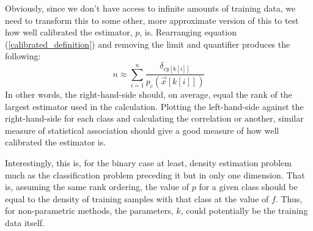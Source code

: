 \documentclass{article}
\newcommand{\binarydecision}{f}
\newcommand{\param}{k}
\newcommand{\estimator}{{p}}
\newcommand{\coord}{x}
\newcommand{\ord}{y}
\begin{document}
Obviously, since we don't have access to infinite amounts of training data,
we need to transform this to some other, more approximate version of this
to test how well calibrated the estimator, $\estimator$, is.
Rearranging equation (\ref{calibrated_definition}) and removing the limit and
quantifier produces the following:
\begin{equation}
	n \approx \sum_{i=1}^n \frac{\delta_{c\ord[k[i]]}}{\estimator_c\left (\vec \coord[k[i]] \right )}
\end{equation}
In other words, the right-hand-side should, on average, equal the rank of the
largest estimator used in the calculation.
Plotting the left-hand-side against the right-hand-side for each class and
calculating the correlation or another, similar measure of statistical
association should give a good measure of how well calibrated the
estimator is.

Interestingly, this is, for the binary case at least, density estimation 
problem much as the classification problem preceding it but in only one
dimension.
That is, assuming the same rank ordering, the value of
$\estimator$ for a given class should be equal to the density of training
samples with that class at the value of $\binarydecision$.
Thus, for non-parametric methods, the parameters, $\param$, could potentially
be the training data itself.
\end{document}
